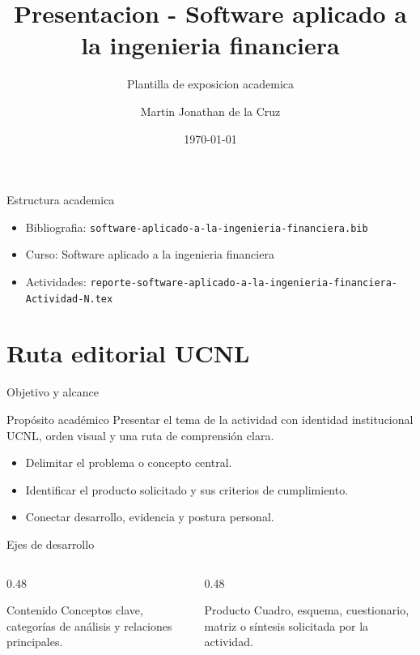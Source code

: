 ﻿\documentclass[spanish,aspectratio=169]{beamer}
\title{Presentacion - Software aplicado a la ingenieria financiera}
\subtitle{Plantilla de exposicion academica}
\author{Martin Jonathan de la Cruz}
\institute{Universidad Ciudadana de Nuevo Leon}
\date{\today}
\begin{document}
\begin{frame}
  \titlepage
\end{frame}

\begin{frame}{Estructura academica}
  \begin{itemize}
    \item Bibliografia: \texttt{software-aplicado-a-la-ingenieria-financiera.bib}
    \item Curso: Software aplicado a la ingenieria financiera
    \item Actividades: \texttt{reporte-software-aplicado-a-la-ingenieria-financiera-Actividad-N.tex}
  \end{itemize}
\end{frame}


\section{Ruta editorial UCNL}

\begin{frame}{Objetivo y alcance}
  \begin{block}{Propósito académico}
    Presentar el tema de la actividad con identidad institucional UCNL, orden visual y una ruta de comprensión clara.
  \end{block}
  \begin{itemize}
    \item Delimitar el problema o concepto central.
    \item Identificar el producto solicitado y sus criterios de cumplimiento.
    \item Conectar desarrollo, evidencia y postura personal.
  \end{itemize}
\end{frame}

\begin{frame}{Ejes de desarrollo}
  \begin{columns}[T,totalwidth=\textwidth]
    \begin{column}{0.48\textwidth}
      \begin{block}{Contenido}
        Conceptos clave, categorías de análisis y relaciones principales.
      \end{block}
    \end{column}
    \begin{column}{0.48\textwidth}
      \begin{block}{Producto}
        Cuadro, esquema, cuestionario, matriz o síntesis solicitada por la actividad.
      \end{block}
    \end{column}
  \end{columns}
\end{frame}
\end{document}
